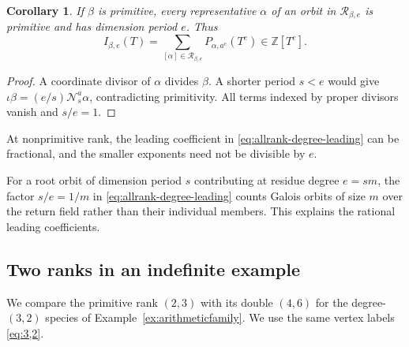 \documentclass[11pt, reqno]{amsart}
\numberwithin{equation}{section}
\newtheorem{corollary}[theorem]{Corollary}
\theoremstyle{definition}
\theoremstyle{remark}
\newcommand{\mb}[1]{\mathbb{#1}}
\newcommand{\mc}[1]{\mathcal{#1}}
\newcommand{\ms}[1]{\mathscr{#1}}
\begin{document}
\begin{corollary}\label{cor:primitive-specialization}
If $\beta$ is primitive, every representative $\alpha$ of an orbit
in $\ms R_{\beta,e}$ is primitive and has dimension period $e$. Thus
\[ I_{\beta,e}(T)= \sum_{[\alpha]\in\ms R_{\beta,e}} P_{\alpha,a^e}(T^e)\in\mb Z[T^e]. \]
\end{corollary}
\begin{proof}
A coordinate divisor of $\alpha$ divides $\beta$. A shorter
period $s<e$ would give
$\iota\beta=(e/s)\mc N_s^a\alpha$, contradicting
primitivity. All terms indexed by proper divisors vanish and $s/e=1$.
\end{proof}

At nonprimitive rank, the leading coefficient in
\eqref{eq:allrank-degree-leading} can be fractional, and the
smaller exponents need not be divisible by $e$.

For a root orbit of dimension period $s$ contributing at
residue degree $e=sm$, the factor $s/e=1/m$ in
\eqref{eq:allrank-degree-leading} counts Galois orbits of size $m$
over the return field rather than their individual members.
This explains the rational leading coefficients.

\subsection{Two ranks in an indefinite example}\label{subsec:indefinite-ranks}

We compare the primitive rank $(2,3)$ with its double $(4,6)$
for the degree-$(3,2)$ species of Example~\ref{ex:arithmeticfamily}.
We use the same vertex labels \eqref{eq:3,2}.
\end{document}
